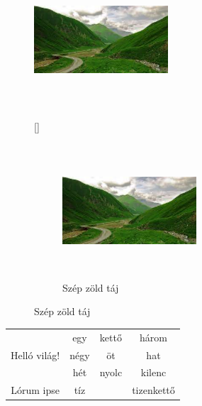\documentclass {article}
\begin{document}
\begin{figure}[b]
\hulipsum[1]
\centering

\includegraphics[width=5cm, height=5cm]{../forras/111.jpg}
\caption[ábra]{Szép zöld táj}
\ref{} 	
	\begin{subfigure}{5cm}
 	\subref{}
	\centering
	\includegraphics[width=5cm, height=5cm, angle=180]{../forras/111.jpg}
	\caption[részábra]{Szép zöld táj}
	\end{subfigure}

\hulipsum[1]
\end{figure}









\vspace{10cm}






\begin{tabular}{c || ccc|}
  & egy & kettő & három \\ 
\cline{1-4}
Helló világ! & négy & öt & hat \\
\cline{2-4}  
  & hét & nyolc & kilenc \\
\cline{2-2}\cline{4-4}
Lórum ipse & tíz & & tizenkettő \\
\cline{1-4}

\end{tabular}
\end{document}
